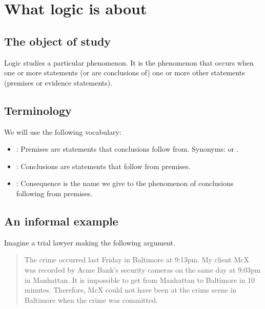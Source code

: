 \documentclass[../../../main.tex]{subfiles}
\begin{document}
\chapter{What logic is about}


\section{The object of study}

Logic studies a particular phenomenon. It is the phenomenon that occurs when one or more statements  (or are conclusions of) one or more other statements (premises or evidence statements).


\section{Terminology}

We will use the following vocabulary:

\begin{itemize}

  \item{
    :
    Premises are statements that conclusions follow from. Synonyms:  or .
  }

  \item{
    :
    Conclusions are statements that follow from premises.
  }
  
  \item{
    :
    Consequence is the name we give to the phenomenon of conclusions following from premises.
  }

\end{itemize}


\section{An informal example}

Imagine a trial lawyer making the following argument. 

\begin{quote}
The crime occurred last Friday in Baltimore at 9:13pm. My client McX was recorded by Acme Bank's security cameras on the same day at 9:03pm in Manhattan. It is impossible to get from Manhattan to Baltimore in 10 minutes. Therefore, McX could not have been at the crime scene in Baltimore when the crime was committed.
\end{quote}
\end{document}
